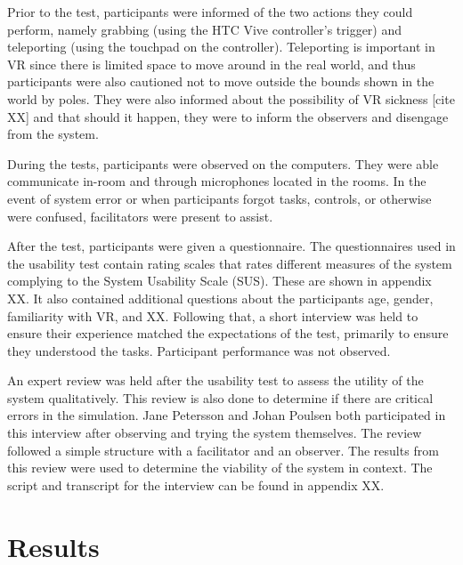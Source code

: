 \documentclass[conference]{IEEEtran}
\begin{document}
Prior to the test, participants were informed of the two actions they could perform, namely grabbing (using the HTC Vive controller's trigger) and teleporting (using the touchpad on the controller). Teleporting is important in VR since there is limited space to move around in the real world, and thus participants were also cautioned not to move outside the bounds shown in the world by poles. They were also informed about the possibility of VR sickness [cite XX] and that should it happen, they were to inform the observers and disengage from the system.

During the tests, participants were observed on the computers. They were able communicate in-room and through microphones located in the rooms. In the event of system error or when participants forgot tasks, controls, or otherwise were confused, facilitators were present to assist. 

After the test, participants were given a questionnaire. The questionnaires used in the usability test contain rating scales that rates different measures of the system complying to the System Usability Scale (SUS). These are shown in appendix XX. It also contained additional questions about the participants age, gender, familiarity with VR, and XX. Following that, a short interview was held to ensure their experience matched the expectations of the test, primarily to ensure they understood the tasks. Participant performance was not observed.

An expert review was held after the usability test to assess the utility of the system qualitatively. This review is also done to determine if there are critical errors in the simulation. Jane Petersson and Johan Poulsen both participated in this interview after observing and trying the system themselves. The review followed a simple structure with a facilitator and an observer. The results from this review were used to determine the viability of the system in context.
The script and transcript for the interview can be found in appendix XX.

  
\section{Results}

\end{document}
